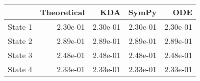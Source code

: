 \begin{tabular}{lrrrr}
\toprule
{} &  Theoretical &      KDA &    SymPy &      ODE \\
\midrule
State 1 &     2.30e-01 & 2.30e-01 & 2.30e-01 & 2.30e-01 \\
State 2 &     2.89e-01 & 2.89e-01 & 2.89e-01 & 2.89e-01 \\
State 3 &     2.48e-01 & 2.48e-01 & 2.48e-01 & 2.48e-01 \\
State 4 &     2.33e-01 & 2.33e-01 & 2.33e-01 & 2.33e-01 \\
\bottomrule
\end{tabular}

